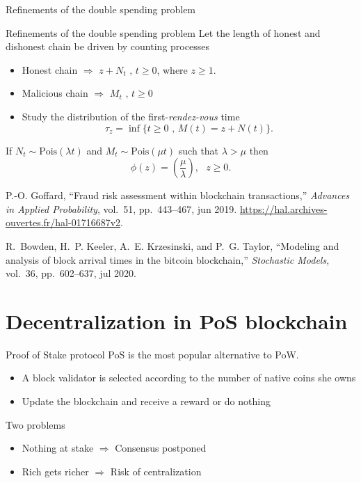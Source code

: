 \documentclass{beamer}
\newcommand*{\warning}{\fontencoding{U}\fontfamily{futs}\selectfont\char 66\relax}
\begin{document}
{\begin{frame}{Refinements of the double spending problem}
\end{frame}
\begin{frame}{Refinements of the double spending problem}
\small
Let the length of honest and dishonest chain be driven by counting processes
\begin{itemize}
\item Honest chain $\Rightarrow$ $z+N_t\text{ , }t\geq0$, where $z\geq1$.
\item Malicious chain $\Rightarrow$ $M_t\text{ , }t\geq0$
\item Study the distribution of the first-\textit{rendez-vous} time
$$
\tau_z=\inf\{t\geq0\text{ , } M(t)=z+N(t)\}.
$$
\end{itemize}
If $N_t\sim\text{Pois}(\lambda t)$ and $M_t\sim\text{Pois}(\mu t)$ such that $\lambda>\mu$ then 
$$
\phi(z) = \left(\frac{\mu}{\lambda}\right),\text{ }z\geq 0.
$$
\tiny
\begin{thebibliography}{1}

P.-O. Goffard, ``Fraud risk assessment within blockchain transactions,'' {\em
  Advances in Applied Probability}, vol.~51, pp.~443--467, jun 2019.
\newblock \url{https://hal.archives-ouvertes.fr/hal-01716687v2}.

R.~Bowden, H.~P. Keeler, A.~E. Krzesinski, and P.~G. Taylor, ``Modeling and
  analysis of block arrival times in the bitcoin blockchain,'' {\em Stochastic
  Models}, vol.~36, pp.~602--637, jul 2020.
\end{thebibliography}

\end{frame}
\section{Decentralization in PoS blockchain}
\begin{frame}{Proof of Stake protocol}
PoS is the most popular alternative to PoW.
\begin{itemize}
  \item A block validator is selected according to the number of native coins she owns
  \item Update the blockchain and receive a reward or do nothing  
\end{itemize}
Two problems 
\begin{itemize}
  \item[\warning] Nothing at stake $\Rightarrow$ Consensus postponed
  \item[\warning] Rich gets richer $\Rightarrow$ Risk of centralization
\end{itemize}


\end{frame}}
\end{document}
